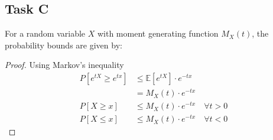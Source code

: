 \subsection*{Task C}
\begin{claim}
	For a random variable \(X\) with moment generating function \(M_X(t)\), the probability bounds are given by:
\end{claim}
\begin{proof}
	Using Markov's inequality
	\begin{align*}
		P[e^{tX} \geq e^{tx}] & \leq \mathbb{E}[e^{tX}] \cdot e^{-tx}         \\
		                      & = M_X(t) \cdot e^{-tx}                        \\
		P[X \geq x]           & \leq M_X(t) \cdot e^{-tx} \quad \forall t > 0 \\
		P[X \leq x]           & \leq M_X(t) \cdot e^{-tx} \quad \forall t < 0
	\end{align*}
\end{proof}

